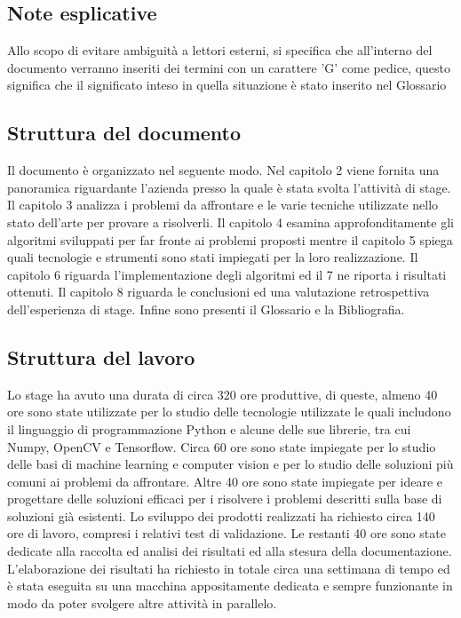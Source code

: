 \subsection{Note esplicative}
Allo scopo di evitare ambiguità a lettori esterni, si specifica che all'interno del documento verranno inseriti dei termini con un carattere 'G' come pedice, questo significa che il significato inteso in quella situazione è stato inserito nel Glossario

\subsection{Struttura del documento}
Il documento è organizzato nel seguente modo. Nel capitolo 2 viene fornita una panoramica riguardante l'azienda presso la quale è stata svolta l'attività di stage. Il capitolo 3 analizza i problemi da affrontare e le varie tecniche utilizzate nello stato dell'arte per provare a risolverli. Il capitolo 4 esamina approfonditamente gli algoritmi sviluppati per far fronte ai problemi proposti mentre il capitolo 5 spiega quali tecnologie e strumenti sono stati impiegati per la loro realizzazione. Il capitolo 6 riguarda l'implementazione degli algoritmi ed il 7 ne riporta i risultati ottenuti. Il capitolo 8 riguarda le conclusioni ed una valutazione retrospettiva dell'esperienza di stage. Infine sono presenti il Glossario e la Bibliografia.

\subsection{Struttura del lavoro}
Lo stage ha avuto una durata di circa 320 ore produttive, di queste, almeno 40 ore sono state utilizzate per lo studio delle tecnologie utilizzate le quali includono il linguaggio di programmazione Python e alcune delle sue librerie, tra cui Numpy, OpenCV e Tensorflow. Circa 60 ore sono state impiegate per lo studio delle basi di machine learning e computer vision e per lo studio delle soluzioni più comuni ai problemi da affrontare. Altre 40 ore sono state impiegate per ideare e progettare delle soluzioni efficaci per i risolvere i problemi descritti sulla base di soluzioni già esistenti. Lo sviluppo dei prodotti realizzati ha richiesto circa 140 ore di lavoro, compresi i relativi test di validazione. Le restanti 40 ore sono state dedicate alla raccolta ed analisi dei risultati ed alla stesura della documentazione. L'elaborazione dei risultati ha richiesto in totale circa una settimana di tempo ed è stata eseguita su una macchina appositamente dedicata e sempre funzionante in modo da poter svolgere altre attività in parallelo.
